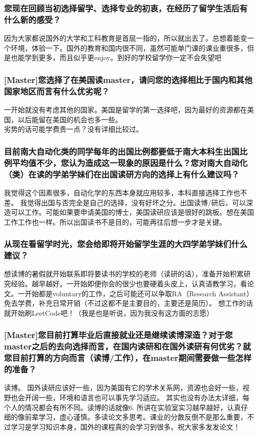 \documentclass[a4paper,UTF8]{book}
\begin{document}
    \subsubsection*{您现在回顾当初选择留学、选择专业的初衷，在经历了留学生活后有什么新的感受？}
    因为大家都说国外的大学和工科教育是首屈一指的，所以就出去了。总想着能变一个环境，体验一下。国外的教育和国内很不同，虽然可能单门课的课业重很多，但是也能学到更多，而且似乎更enjoy。到好的学校留学你一定不会失望吧

    \subsubsection*{[Master]您选择了在美国读master，请问您的选择相比于国内和其他国家地区而言有什么优劣呢？}
    一开始就没有考虑其他的国家。美国是留学的第一选择吧，因为最好的资源都在美国，以后能留在美国的机会也多一些。\\
    劣势的话可能学费贵一点？没有详细比较过。

    \subsubsection*{目前南大自动化类的同学每年的出国比例都要低于南大本科生出国比例平均值不少，您认为造成这一现象的原因是什么？您对南大自动化（类）在读的学弟学妹们在出国读研方向的选择上有什么建议吗？}
    我觉得这个因素很多，自动化学的东西本身就应用较多，本科直接选择工作也不差。
    我觉得出国与否完全是自己的选择，没有好坏之分。出国读博/研后，可以深造可以工作。可能如果要申请美国的博士，美国读研应该是很好的跳板。想在美国工作工作也一样。所以出国读书不是目的，可能再往后想一步才是关键。

    \subsubsection*{从现在看留学时光，您会给即将开始留学生涯的大四学弟学妹们什么建议？}
    想读博的暑假就开始联系即将要读书的学校的老师（读研的话），准备开始积累研究经验。越早越好。一开始即便你会的很少也要硬着头皮上，认真请教学习，看论文。一开始都是voluntary的工作，之后可能还可以争取RA（Research Assistant）免去学费，补充日常开销（不过这都不是主要目的，主要还是简历）。
    想工作的话就开始刷LeetCode吧！（我是也是听说，因为我没有这方面的志愿）

    \subsubsection*{[Master]您目前打算毕业后直接就业还是继续读博深造？对于您master之后的去向选择而言，在国内读研和在国外读研有何优劣？就您目前打算的方向而言（读博/工作），在master期间需要做一些怎样的准备？}
    读博。
    国外读研应该好一些，因为美国有它的学术关系网，资源也会好一些，视野也会开阔一些，环境和语言也可以事先学习适应。
    其实也没有办法太详细，每个人的情况都会有所不同。读博的话就像6. 所讲在实验室实习越早越好，认真仔细的像前辈学习，虚心谨慎。多读论文多思考。课业的分数反倒不是那么重要，不过学习是学习知识本身，国外的课程真的会学习到很多。祝大家多发发论文！
\end{document}
